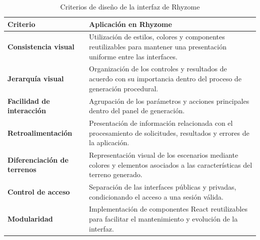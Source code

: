 \begin{table}[htbp]
	\centering
	
	\caption{Criterios de diseño de la interfaz de Rhyzome}
	\label{tab:criterios_diseno_interfaz}
	
	\renewcommand{\arraystretch}{1.5}
	
	\begin{tabularx}{\textwidth}{
			|>{\raggedright\arraybackslash}p{3.5cm}|
			>{\raggedright\arraybackslash}X|
		}
		\hline
		
		\rowcolor{gray!15}
		\textbf{Criterio} &
		\textbf{Aplicación en Rhyzome} \\
		
		\hline
		
		\textbf{Consistencia visual} &
		Utilización de estilos, colores y componentes reutilizables para mantener una presentación uniforme entre las interfaces. \\
		
		\hline
		
		\textbf{Jerarquía visual} &
		Organización de los controles y resultados de acuerdo con su importancia dentro del proceso de generación procedural. \\
		
		\hline
		
		\textbf{Facilidad de interacción} &
		Agrupación de los parámetros y acciones principales dentro del panel de generación. \\
		
		\hline
		
		\textbf{Retroalimentación} &
		Presentación de información relacionada con el procesamiento de solicitudes, resultados y errores de la aplicación. \\
		
		\hline
		
		\textbf{Diferenciación de terrenos} &
		Representación visual de los escenarios mediante colores y elementos asociados a las características del terreno generado. \\
		
		\hline
		
		\textbf{Control de acceso} &
		Separación de las interfaces públicas y privadas, condicionando el acceso a una sesión válida. \\
		
		\hline
		
		\textbf{Modularidad} &
		Implementación de componentes React reutilizables para facilitar el mantenimiento y evolución de la interfaz. \\
		

\end{tabularx}
\end{table}
